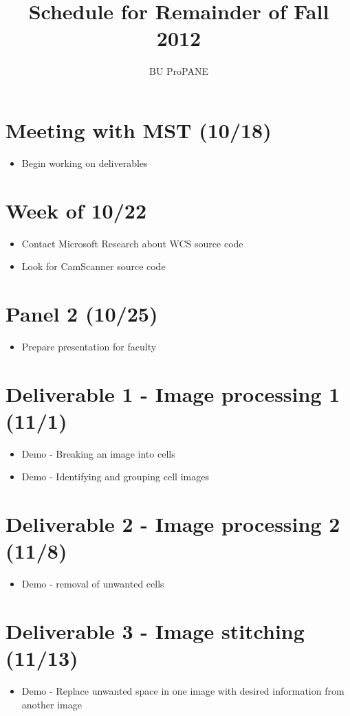 \documentclass[]{article}
\begin{document}
\title{\textbf{Schedule for Remainder of Fall 2012}}
\author{BU ProPANE}
\date{}
\maketitle
	
	\thispagestyle{empty}
	\section*{Meeting with MST (10/18)}
	\begin{itemize}
	\item{Begin working on deliverables}
	\end{itemize}
	\section*{Week of 10/22}
	\begin{itemize}
		\item{Contact Microsoft Research about WCS source code}
		\item{Look for CamScanner source code}
	\end{itemize}
	\section*{Panel 2 (10/25)}
	\begin{itemize}
		\item{Prepare presentation for faculty}
	\end{itemize}
	\section*{Deliverable 1 - Image processing 1 (11/1)}
	\begin{itemize}
	\item{Demo - Breaking an image into cells}
	\item{Demo - Identifying and grouping cell images}
	\end{itemize}
	\section*{Deliverable 2 - Image processing 2 (11/8)}
	\begin{itemize}
		\item{Demo - removal of unwanted cells}
	\end{itemize}
	\section*{Deliverable 3 - Image stitching (11/13)}
	\begin{itemize}
		\item{Demo - Replace unwanted space in one image with desired information from another image}
	\end{itemize}
\end{document}
